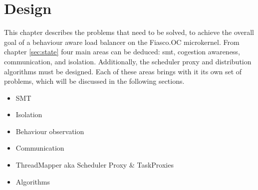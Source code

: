 \chapter{Design}
\label{sec:design}




This chapter describes the problems that need to be solved, to achieve the
overall goal of a behaviour aware load balancer on the Fiasco.OC microkernel.
From chapter \ref{sec:state} four main areas can be deduced: \gls{smt},
cogestion awareness, communication, and isolation.
Additionally, the scheduler proxy and distribution algorithms must be designed.
Each of these areas brings with it its own set of problems, which will be
discussed in the following sections.










\begin{itemize}
  \item SMT
  \item Isolation
  \item Behaviour observation
  \item Communication
  \item ThreadMapper aka Scheduler Proxy \& TaskProxies
  \item Algorithms
\end{itemize}

